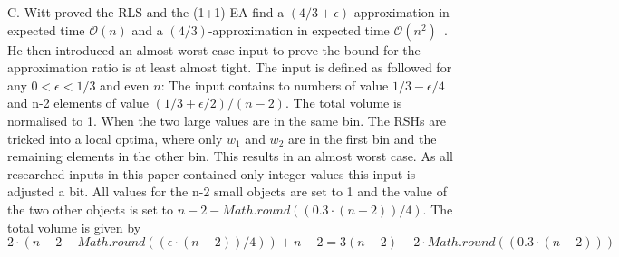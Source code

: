 C. Witt proved the RLS and the (1+1) EA find a $(4/3+\epsilon)$ approximation in expected time $\mathcal{O}(n)$ and a $(4/3)$-approximation in expected time $\mathcal{O}(n^2)$~\cite{diekert2005stacs}.
He then introduced an almost worst case input to prove the bound for the approximation ratio is at least almost tight.
The input is defined as followed for any $0<\epsilon<1/3$ and even $n$:
The input contains to numbers of value $1/3 - \epsilon/4$ and n-2 elements of value $(1/3+\epsilon/2)/(n-2)$. 
The total volume is normalised to 1.
When the two large values are in the same bin. The RSHs are tricked into a local optima, where only $w_1$ and $w_2$ are in the first bin and the remaining elements in the other bin.
This results in an almost worst case.
As all researched inputs in this paper contained only integer values this input is adjusted a bit.
All values for the n-2 small objects are set to 1 and the value of the two other objects is set to $n-2-Math.round((0.3\cdot(n - 2)) /4)$.
The total volume is given by $2\cdot(n-2-Math.round((\epsilon\cdot(n - 2)) /4))+n-2 = 3(n-2)-2\cdot Math.round((0.3\cdot(n - 2)))$